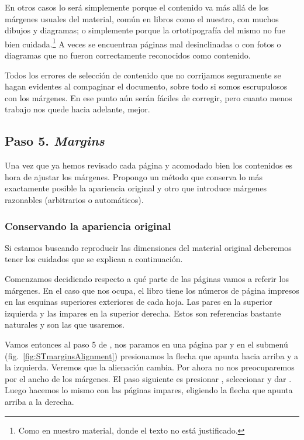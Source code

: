 \documentclass[%
	a5paper,
	10pt,
	twoside,
	openright,
	final,
]{memoir}
\begin{document}
	En otros casos lo será simplemente porque el contenido va más allá de los márgenes usuales del material, común en libros como el nuestro, con muchos dibujos y diagramas; o simplemente porque la ortotipografía del mismo no fue bien cuidada.\footnote{Como en nuestro material, donde el texto no está justificado.} A veces se encuentran páginas mal desinclinadas o con fotos o diagramas que no fueron correctamente reconocidos como contenido.

	Todos los errores de selección de contenido que no corrijamos seguramente se hagan evidentes al compaginar el documento, sobre todo si somos escrupulosos con los márgenes. En ese punto aún serán fáciles de corregir, pero cuanto menos trabajo nos quede hacia adelante, mejor.

	\subsection{Paso 5. \emph{Margins}\label{sec:STmargins}} Una vez que ya hemos revisado cada página y acomodado bien los contenidos es hora de ajustar los márgenes. Propongo un método que conserva lo más exactamente posible la apariencia original y otro que introduce márgenes razonables (arbitrarios o automáticos).

	\subsubsection{Conservando la apariencia original\label{sec:STmarginsOriginals}} Si estamos buscando reproducir las dimensiones del material original deberemos tener los cuidados que se explican a continuación.

	Comenzamos decidiendo respecto a qué parte de las páginas vamos a referir los márgenes. En el caso que nos ocupa, el libro tiene los números de página impresos en las esquinas superiores exteriores de cada hoja. Las pares en la superior izquierda y las impares en la superior derecha. Estos son referencias bastante naturales y son las que usaremos.

	Vamos entonces al paso 5 de \scantailor, nos paramos en una página par y en el submenú  (fig.~\ref{fig:STmarginsAlignment}) presionamos la flecha que apunta hacia arriba y a la izquierda. Veremos que la alienación cambia. Por ahora no nos preocuparemos por el ancho de los márgenes. El paso siguiente es presionar , seleccionar  y dar . Luego hacemos lo mismo con las páginas impares, eligiendo la flecha que apunta arriba a la derecha.
\end{document}
